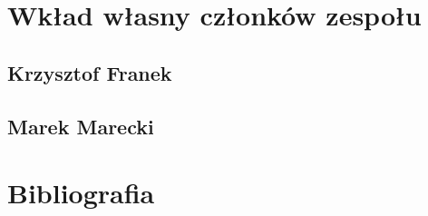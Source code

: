 \documentclass[11pt,oneside,a4paper,titlepage,onecolumn]{book}
\begin{document}




\chapter{Wkład własny członków zespołu}
\label{wklad_wlasny_czlonkow_zespolu}

\section{Krzysztof Franek}

\section{Marek Marecki}



\chapter{Bibliografia}
\end{document}
